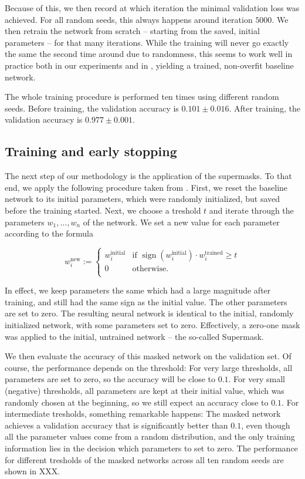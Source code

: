 \documentclass[12pt,final,twoside]{article}
\theoremstyle{plain}
\theoremstyle{definition}
\theoremstyle{remark}
\theoremstyle{named}
\begin{document}

Because of this, we then record at which iteration the minimal validation loss was achieved. For all random seeds, this always happens around iteration $5000$. We then retrain the network from scratch -- starting from the saved, initial parameters -- for that many iterations. While the training will never go exactly the same the second time around due to randomness, this seems to work well in practice both in our experiments and in \cite{supermask}, yielding a trained, non-overfit baseline network.

The whole training procedure is performed ten times using different random seeds. Before training, the validation accuracy is $0.101 \pm 0.016$. After training, the validation accuracy is $0.977 \pm 0.001$.

\subsection{Training and early stopping}

The next step of our methodology is the application of the supermasks. To that end, we apply the following procedure taken from \cite{supermask}. First, we reset the baseline network to its initial parameters, which were randomly initialized, but saved before the training started. Next, we choose a treshold $t$ and iterate through the parameters $w_1, \ldots, w_n$ of the network. We set a new value for each parameter according to the formula
 
$$
w_i^{\text{new}} := \begin{cases}
w_i^{\text{initial}} & \text{if } \operatorname{sign}\left(w_i^{\text{initial}} \right) \cdot w_i^{\text{trained}} \geq t \\ 
0 & \text{otherwise.} \\
\end{cases}
$$

In effect, we keep parameters the same which had a large magnitude after training, and still had the same sign as the initial value. The other parameters are set to zero. The resulting neural network is identical to the initial, randomly initialized network, with some parameters set to zero. Effectively, a zero-one mask was applied to the initial, untrained network -- the so-called Supermask.

We then evaluate the accuracy of this masked network on the validation set. Of course, the performance depends on the threshold: For very large thresholds, all parameters are set to zero, so the accuracy will be close to $0.1$. For very small (negative) thresholds, all parameters are kept at their initial value, which was randomly chosen at the beginning, so we still expect an accuracy close to $0.1$. For intermediate tresholds, something remarkable happens: The masked network achieves a validation accuracy that is significantly better than $0.1$, even though all the parameter values come from a random distribution, and the only training information lies in the decision which parameters to set to zero. The performance for different tresholds of the masked networks across all ten random seeds are shown in XXX.
\end{document}
